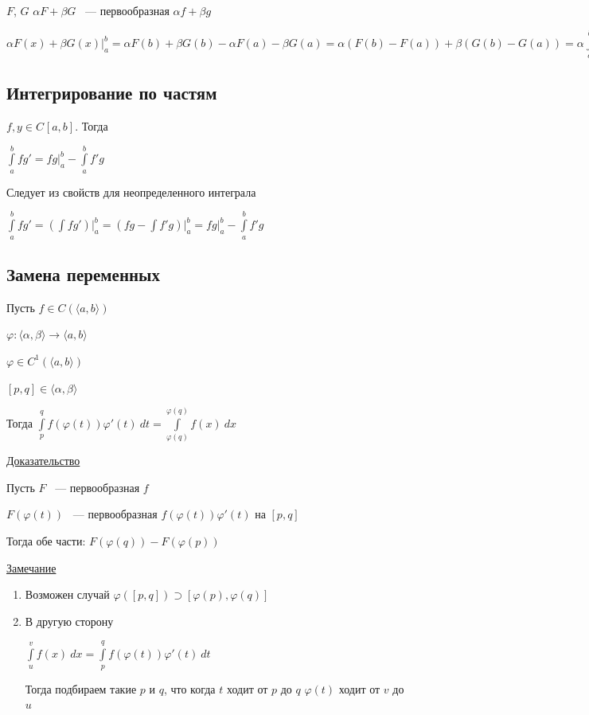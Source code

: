 \documentclass{article}
\begin{document}
			$F$, $G$ $\alpha F + \beta G$ ~--- первообразная $\alpha f + \beta g$
			
			$\alpha F(x) + \beta G(x) \bigg|^b_a = \alpha F(b) + \beta G(b) - \alpha F(a) - \beta G(a) = \alpha (F(b) - F(a)) + \beta (G(b) - G(a)) = \alpha \int\limits^b_a f + \beta \int\limits^b_a g$
			
		\subsection{Интегрирование по частям}
		
			$f, y \in C^{}[a, b]$. Тогда
			
			$\int\limits^b_a f g' = fg \bigg|^b_a - \int\limits^b_a f'g$
			
			Следует из свойств для неопределенного интеграла
			
			$\int\limits^b_a f g' = (\int f g') \bigg|^b_a = (fg - \int f' g) \bigg|^b_a = fg \bigg|^b_a - \int\limits^b_a f'g$
		
		\subsection{Замена переменных}

			Пусть $f \in C(\langle a, b \rangle)$

			$\varphi : \langle \alpha, \beta \rangle \rightarrow \langle a, b \rangle$

			$\varphi \in C^1 (\langle a, b \rangle)$

			$[p, q] \in \langle \alpha, \beta \rangle$

			Тогда $\int\limits^q_p f(\varphi(t))\varphi'(t) \ dt = \int\limits^{\varphi(q)}_{\varphi(q)} f(x) \ dx$

			\underline{Доказательство}

			Пусть $F$ ~--- первообразная $f$
	
			$F(\varphi(t))$ ~--- первообразная $f(\varphi(t))\varphi'(t)$ на $[p, q]$

			Тогда обе части: $F(\varphi(q)) - F(\varphi(p))$

			\underline{Замечание}

			\begin{enumerate}

				\item Возможен случай $\varphi([p, q]) \supset [\varphi(p), \varphi(q)]$

				\item В другую сторону

					$\int\limits^v_u f(x) \ dx = \int\limits^q_p f(\varphi(t))\varphi'(t) \ dt$

					Тогда подбираем такие $p$ и $q$, что когда $t$ ходит от $p$ до $q$ $\varphi(t)$ ходит от $v$ до $u$

			\end{enumerate}
	\newpage
	
\end{document}
